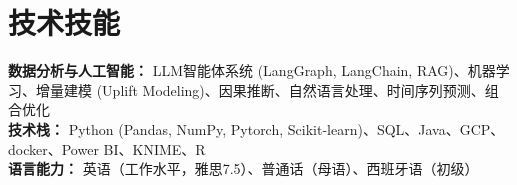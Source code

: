 \documentclass[11pt]{article}
\begin{document}
\section{技术技能}

{\small\noindent
\textbf{数据分析与人工智能：} LLM智能体系统 (LangGraph, LangChain, RAG)、机器学习、增量建模 (Uplift Modeling)、因果推断、自然语言处理、时间序列预测、组合优化\\[0pt]
\textbf{技术栈：} Python (Pandas, NumPy, Pytorch, Scikit-learn)、SQL、Java、GCP、docker、Power BI、KNIME、R\\[0pt]
\textbf{语言能力：} 英语（工作水平，雅思7.5）、普通话（母语）、西班牙语（初级）
}
\end{document}
